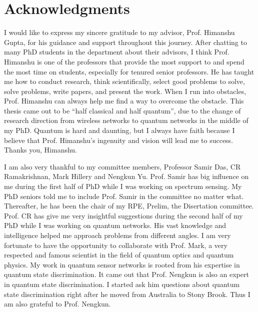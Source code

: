 \chapter{Acknowledgments}


I would like to express my sincere gratitude to my advisor, Prof. Himanshu Gupta, for his guidance and support throughout this journey. 
After chatting to many PhD students in the department about their advisors, I think Prof. Himanshu is one of the professors that provide 
the most support to and spend the most time on students, especially for tenured senior professors.
He has taught me how to conduct research, think scientifically, select good problems to solve, solve problems, write papers, and present the work.
When I run into obstacles, Prof. Himanshu can always help me find a way to overcome the obstacle.
This thesis came out to be ``half classical and half quantum'', due to the change of research direction from wireless networks to
quantum networks in the middle of my PhD. Quantum is hard and daunting, but I always have faith because I believe that 
Prof. Himanshu's ingenuity and vision will lead me to success. Thanks you, Himanshu.

I am also very thankful to my committee members, Professor Samir Das, CR Ramakrishnan, Mark Hillery and Nengkun Yu. 
Prof. Samir has big influence on me during the first half of PhD while I was working on spectrum sensing.
My PhD seniors told me to include Prof. Samir in the committee no matter what. 
Thereafter, he has been the chair of my RPE, Prelim, the Disertation committee.
Prof. CR has give me very insightful suggestions during the second half of my PhD while I was working on quantum networks.
His vast knowledge and intelligence helped me approach problems from different angles.
I am very fortunate to have the opportunity to collaborate with Prof. Mark, a very respected and famous scientist 
in the field of quantum optics and quantum physics. My work in quantum sensor networks is rooted from his expertise in quantum state discrimination.
It came out that Prof. Nengkun is also an expert in quantum state discrimination. I started ask him questions about quantum state discrimination right after
he moved from Australia to Stony Brook. Thus I am also grateful to Prof. Nengkun.

